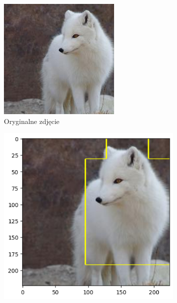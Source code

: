 \begin{figure}[h]
	\centering
	\begin{subfigure}[b]{0.3\textwidth}
		\includegraphics[width=.9\textwidth]{img/examples/appendix/n02120079_49517}
		\caption{Oryginalne zdjęcie}  \label{}
	\end{subfigure}
	\begin{subfigure}[b]{0.3\textwidth}
		\centering\includegraphics[width=.9\textwidth]{img/examples/appendix/n02120079_49517_gradcam}

\end{subfigure}
\end{figure}

